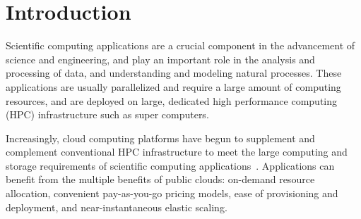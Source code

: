 \vspace*{\largesubsecspace}
\section{Introduction}
\label{sec:intro}








Scientific computing applications are a crucial component in the advancement of science and engineering, and play an important role in the analysis and processing of data, and understanding and modeling natural processes. 
These applications are usually parallelized and require a large amount of computing resources, and are deployed on large, dedicated high performance computing (HPC) infrastructure such as super computers. 

Increasingly, cloud computing platforms have begun to supplement and complement conventional HPC  infrastructure  to meet the large computing and storage requirements of scientific computing applications~\cite{buyya-hpc-survey}. 
%
Applications can benefit from the multiple benefits of public clouds: on-demand resource allocation, convenient pay-as-you-go pricing models, ease of provisioning and deployment, and near-instantaneous elastic scaling. 



